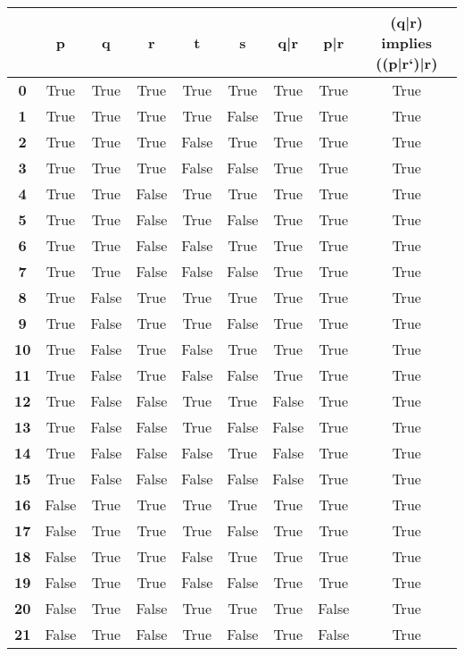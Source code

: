 \begin{tabular}{c|cccccccc}
 & \textbf{p} & \textbf{q} & \textbf{r} & \textbf{t} & \textbf{s} & \textbf{q|r} & \textbf{p|r} & \textbf{(q|r) implies ((p|r`)|r)}\\\hline
\textbf{0} & True & True & True & True & True & True & True & True\\
\textbf{1} & True & True & True & True & False & True & True & True\\
\textbf{2} & True & True & True & False & True & True & True & True\\
\textbf{3} & True & True & True & False & False & True & True & True\\
\textbf{4} & True & True & False & True & True & True & True & True\\
\textbf{5} & True & True & False & True & False & True & True & True\\
\textbf{6} & True & True & False & False & True & True & True & True\\
\textbf{7} & True & True & False & False & False & True & True & True\\
\textbf{8} & True & False & True & True & True & True & True & True\\
\textbf{9} & True & False & True & True & False & True & True & True\\
\textbf{10} & True & False & True & False & True & True & True & True\\
\textbf{11} & True & False & True & False & False & True & True & True\\
\textbf{12} & True & False & False & True & True & False & True & True\\
\textbf{13} & True & False & False & True & False & False & True & True\\
\textbf{14} & True & False & False & False & True & False & True & True\\
\textbf{15} & True & False & False & False & False & False & True & True\\
\textbf{16} & False & True & True & True & True & True & True & True\\
\textbf{17} & False & True & True & True & False & True & True & True\\
\textbf{18} & False & True & True & False & True & True & True & True\\
\textbf{19} & False & True & True & False & False & True & True & True\\
\textbf{20} & False & True & False & True & True & True & False & True\\
\textbf{21} & False & True & False & True & False & True & False & True\\

\end{tabular}
